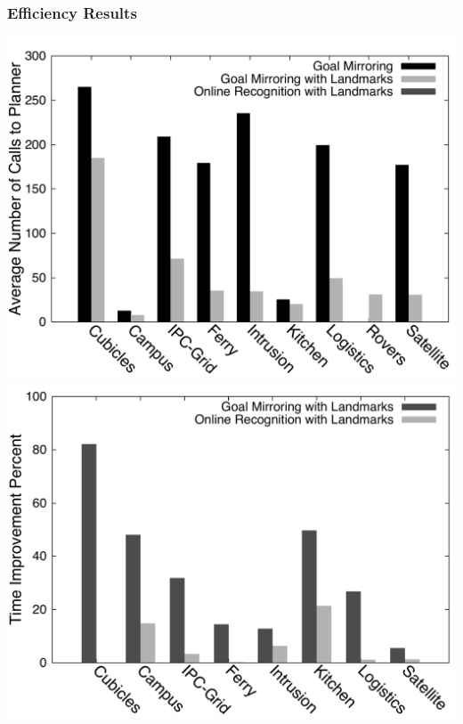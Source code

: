 \documentclass{beamer}
\begin{document}
	\begin{frame}[c]\frametitle{Efficiency Results}
		\begin{center}
			\includegraphics[width=.45\textwidth]{fig/histogram-number_of_calls_to_planner.pdf}
			\includegraphics[width=.45\textwidth]{fig/histogram-time_improvement_percent.pdf}
		\end{center}
	\end{frame}
	
\end{document}
